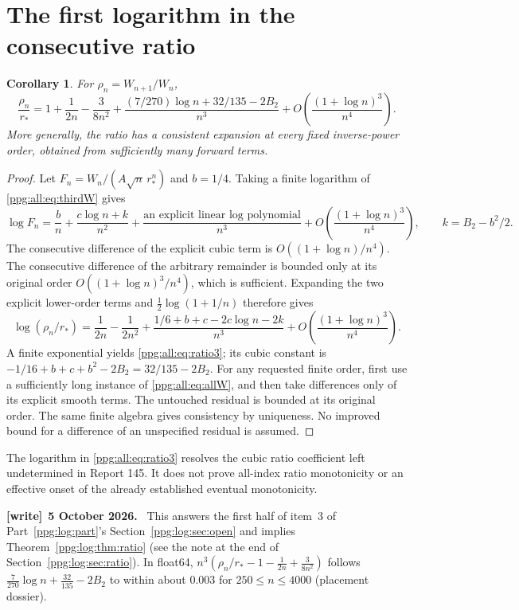 \documentclass[11pt,letterpaper]{article}
\newtheorem{corollary}[theorem]{Corollary}
\theoremstyle{remark}\newtheorem{remark}[theorem]{Remark}
\numberwithin{equation}{section}
\newenvironment{writenote}[1][]{\par\smallskip\begingroup\small
 \noindent\textbf{[write]}\if\relax\detokenize{#1}\relax\else~\textbf{#1.}\fi\ }%
 {\par\endgroup\smallskip}
\begin{document}
\section{The first logarithm in the consecutive ratio}\label{ppg:all:sec:ratio}
\begin{corollary}\label{ppg:all:cor:ratio}
For $\rho_n=W_{n+1}/W_n$,
\begin{equation}\label{ppg:all:eq:ratio3}
 \frac{\rho_n}{r_*}
 =1+\frac1{2n}-\frac3{8n^2}
   +\frac{(7/270)\log n+32/135-2B_2}{n^3}
   +O\!\left(\frac{(1+\log n)^3}{n^4}\right).
\end{equation}
More generally, the ratio has a consistent expansion at every fixed inverse-power order, obtained from sufficiently many forward terms.
\end{corollary}
\begin{proof}
Let $F_n=W_n/(A\sqrt n\,r_*^n)$ and $b=1/4$. Taking a finite logarithm of \eqref{ppg:all:eq:thirdW} gives
\[
 \log F_n=\frac b n+\frac{c\log n+k}{n^2}
       +\frac{\text{an explicit linear log polynomial}}{n^3}
       +O\!\left(\frac{(1+\log n)^3}{n^4}\right),\qquad
 k=B_2-b^2/2.
\]
The consecutive difference of the explicit cubic term is $O((1+\log n)/n^4)$. The consecutive difference of the arbitrary remainder is bounded only at its original order $O((1+\log n)^3/n^4)$, which is sufficient. Expanding the two explicit lower-order terms and $\frac12\log(1+1/n)$ therefore gives
\[
 \log(\rho_n/r_*)
 =\frac1{2n}-\frac1{2n^2}
   +\frac{1/6+b+c-2c\log n-2k}{n^3}
   +O\!\left(\frac{(1+\log n)^3}{n^4}\right).
\]
A finite exponential yields \eqref{ppg:all:eq:ratio3}; its cubic constant is
$-1/16+b+c+b^2-2B_2=32/135-2B_2$.
For any requested finite order, first use a sufficiently long instance of \eqref{ppg:all:eq:allW}, and then take differences only of its explicit smooth terms. The untouched residual is bounded at its original order. The same finite algebra gives consistency by uniqueness. No improved bound for a difference of an unspecified residual is assumed.
\end{proof}
The logarithm in \eqref{ppg:all:eq:ratio3} resolves the cubic ratio coefficient left undetermined in Report 145. It does not prove all-index ratio monotonicity or an effective onset of the already established eventual monotonicity.
\begin{writenote}[5 October 2026]
This answers the first half of item~3 of Part~\ref{ppg:log:part}'s Section~\ref{ppg:log:sec:open} and implies Theorem~\ref{ppg:log:thm:ratio} (see the note at the end of Section~\ref{ppg:log:sec:ratio}). In float64, $n^3(\rho_n/r_*-1-\frac1{2n}+\frac3{8n^2})$ follows $\frac7{270}\log n+\frac{32}{135}-2B_2$ to within about $0.003$ for $250\le n\le4000$ (placement dossier).
\end{writenote}
\end{document}
